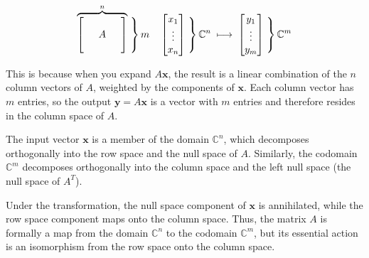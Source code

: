 \documentclass[12pt]{article}
\begin{document}
\[
\overbrace{
\left[
\begin{array}{ccc}
  &   &   \\
  & A &   \\
  &   &  
\end{array}
\right]
}^{n}
\left.\vphantom{\begin{array}{c} \\ \\ \\ \end{array}}\right\} m
\quad
\begin{bmatrix}
x_1 \\ \vdots \\ x_n
\end{bmatrix}
\left.\vphantom{\begin{array}{c} \\ \\ \\ \end{array}}\right\} \mathbb{C}^n
\;\longmapsto\;
\begin{bmatrix}
y_1 \\ \vdots \\ y_m
\end{bmatrix}
\left.\vphantom{\begin{array}{c} \\ \\ \\ \end{array}}\right\} \mathbb{C}^m
\]


This is because when you expand \(A\mathbf{x}\), the result is a linear combination of the \(n\) column vectors of \(A\), weighted by the components of \(\mathbf{x}\). Each column vector has \(m\) entries, so the output \(\mathbf{y} = A\mathbf{x}\) is a vector with \(m\) entries and therefore resides in the column space of \(A\).

The input vector \(\mathbf{x}\) is a member of the domain \(\mathbb{C}^n\), which decomposes orthogonally into the row space and the null space of \(A\). Similarly, the codomain \(\mathbb{C}^m\) decomposes orthogonally into the column space and the left null space (the null space of \(A^T\)).

Under the transformation, the null space component of \(\mathbf{x}\) is annihilated, while the row space component maps onto the column space. Thus, the matrix \(A\) is formally a map from the domain \(\mathbb{C}^n\) to the codomain \(\mathbb{C}^m\), but its essential action is an isomorphism from the row space onto the column space.
\end{document}
